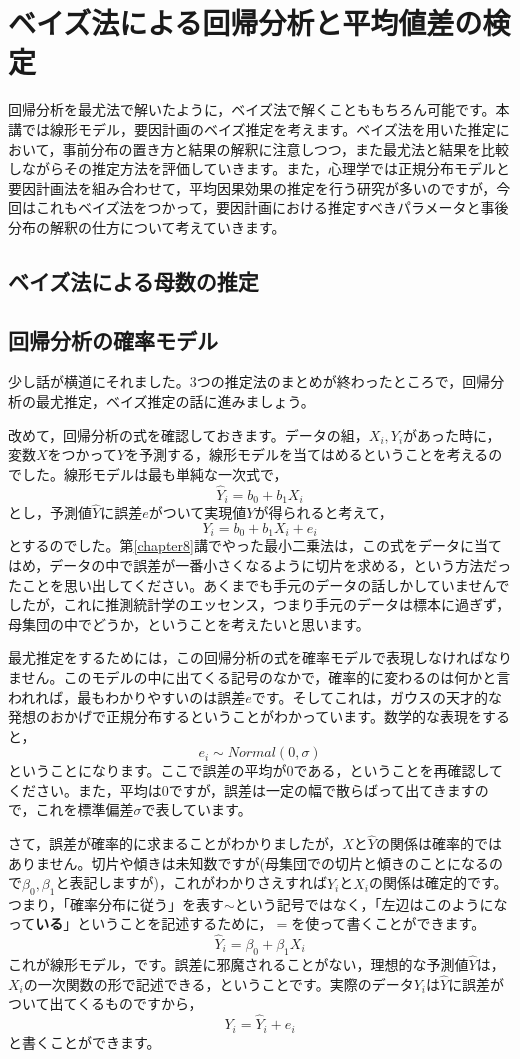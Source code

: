 \documentclass{ltjsarticle}
\begin{document}
\chapter{ベイズ法による回帰分析と平均値差の検定}
\label{chapter26}
回帰分析を最尤法で解いたように，ベイズ法で解くことももちろん可能です。本講では線形モデル，要因計画のベイズ推定を考えます。ベイズ法を用いた推定において，事前分布の置き方と結果の解釈に注意しつつ，また最尤法と結果を比較しながらその推定方法を評価していきます。また，心理学では正規分布モデルと要因計画法を組み合わせて，平均因果効果の推定を行う研究が多いのですが，今回はこれもベイズ法をつかって，要因計画における推定すべきパラメータと事後分布の解釈の仕方について考えていきます。

\section{ベイズ法による母数の推定}


\section{回帰分析の確率モデル}
少し話が横道にそれました。3つの推定法のまとめが終わったところで，回帰分析の最尤推定，ベイズ推定の話に進みましょう。

改めて，回帰分析の式を確認しておきます。データの組，$X_i,Y_i$があった時に，変数$X$をつかって$Y$を予測する，線形モデルを当てはめるということを考えるのでした。線形モデルは最も単純な一次式で，
\[\hat{Y}_i = b_0 + b_1 X_i \]
とし，予測値$\hat{Y}$に誤差$e$がついて実現値$Y$が得られると考えて，
\[ Y_i= b_0 + b_1 X_i + e_i  \]
とするのでした。第\ref{chapter8}講でやった最小二乗法は，この式をデータに当てはめ，データの中で誤差が一番小さくなるように切片を求める，という方法だったことを思い出してください。あくまでも手元のデータの話しかしていませんでしたが，これに推測統計学のエッセンス，つまり手元のデータは標本に過ぎず，母集団の中でどうか，ということを考えたいと思います。

最尤推定をするためには，この回帰分析の式を確率モデルで表現しなければなりません。このモデルの中に出てくる記号のなかで，確率的に変わるのは何かと言われれば，最もわかりやすいのは誤差$e$です。そしてこれは，ガウスの天才的な発想のおかげで正規分布するということがわかっています。数学的な表現をすると，
\[ e_i \sim Normal(0,\sigma) \]
ということになります。ここで誤差の平均が0である，ということを再確認してください。また，平均は0ですが，誤差は一定の幅で散らばって出てきますので，これを標準偏差$\sigma$で表しています。

さて，誤差が確率的に求まることがわかりましたが，$X$と$\hat{Y}$の関係は確率的ではありません。切片や傾きは未知数ですが(母集団での切片と傾きのことになるので$\beta_0,\beta_1$と表記しますが)，これがわかりさえすれば$\hat{Y}_i$と$X_i$の関係は確定的です。つまり，「確率分布に従う」を表す$\sim$という記号ではなく，「左辺はこのようになって\textbf{いる}」ということを記述するために，$=$を使って書くことができます。
\[ \hat{Y}_i = \beta_0 + \beta_1 X_i \]
これが線形モデル，です。誤差に邪魔されることがない，理想的な予測値$\hat{Y}$は，$X_i$の一次関数の形で記述できる，ということです。実際のデータ$Y_i$は$\hat{Y}$に誤差がついて出てくるものですから，
\[ Y_i = \hat{Y}_i + e_i  \]
と書くことができます。
\end{document}
